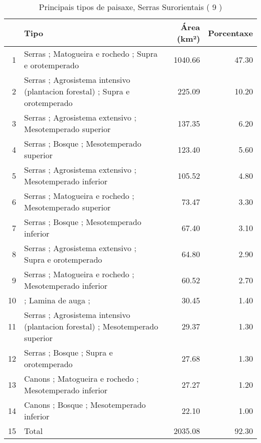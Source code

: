 \begin{table}[p]
\centering
\caption{Principais tipos de paisaxe,  Serras Surorientais ( 9 )} 
\label{Tipos 9}
\begin{tabular}{rlrr}
  \hline
 & Tipo & Área (km²) & Porcentaxe \\ 
  \hline
1 & Serras ; Matogueira e rochedo ; Supra e orotemperado & 1040.66 & 47.30 \\ 
  2 & Serras ; Agrosistema intensivo (plantacion forestal) ; Supra e orotemperado & 225.09 & 10.20 \\ 
  3 & Serras ; Agrosistema extensivo ; Mesotemperado superior & 137.35 & 6.20 \\ 
  4 & Serras ; Bosque ; Mesotemperado superior & 123.40 & 5.60 \\ 
  5 & Serras ; Agrosistema extensivo ; Mesotemperado inferior & 105.52 & 4.80 \\ 
  6 & Serras ; Matogueira e rochedo ; Mesotemperado superior & 73.47 & 3.30 \\ 
  7 & Serras ; Bosque ; Mesotemperado inferior & 67.40 & 3.10 \\ 
  8 & Serras ; Agrosistema extensivo ; Supra e orotemperado & 64.80 & 2.90 \\ 
  9 & Serras ; Matogueira e rochedo ; Mesotemperado inferior & 60.52 & 2.70 \\ 
  10 &  ; Lamina de auga ;  & 30.45 & 1.40 \\ 
  11 & Serras ; Agrosistema intensivo (plantacion forestal) ; Mesotemperado superior & 29.37 & 1.30 \\ 
  12 & Serras ; Bosque ; Supra e orotemperado & 27.68 & 1.30 \\ 
  13 & Canons ; Matogueira e rochedo ; Mesotemperado inferior & 27.27 & 1.20 \\ 
  14 & Canons ; Bosque ; Mesotemperado inferior & 22.10 & 1.00 \\ 
  15 & Total & 2035.08 & 92.30 \\ 
   \hline
\end{tabular}
\end{table}
